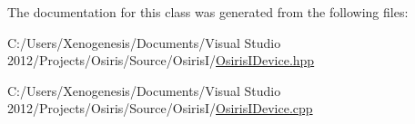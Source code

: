 The documentation for this class was generated from the following files\-:\begin{DoxyCompactItemize}
\item 
C\-:/\-Users/\-Xenogenesis/\-Documents/\-Visual Studio 2012/\-Projects/\-Osiris/\-Source/\-Osiris\-I/\hyperlink{_osiris_i_device_8hpp}{Osiris\-I\-Device.\-hpp}\item 
C\-:/\-Users/\-Xenogenesis/\-Documents/\-Visual Studio 2012/\-Projects/\-Osiris/\-Source/\-Osiris\-I/\hyperlink{_osiris_i_device_8cpp}{Osiris\-I\-Device.\-cpp}\end{DoxyCompactItemize}
